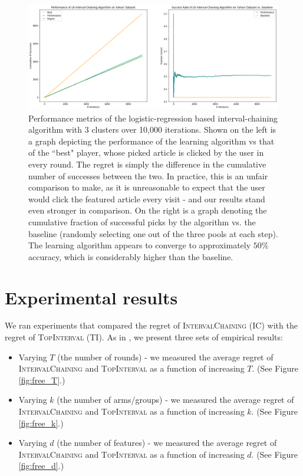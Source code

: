 \documentclass[11pt]{article}
\begin{document}
\begin{figure}
\includegraphics[width=\textwidth]{yahoo-interval-chaining.png}
\caption{Performance metrics of the logistic-regression based interval-chaining algorithm with $3$ clusters over 10,000 iterations. Shown on the left is a graph depicting the performance of the learning algorithm vs that of the ``best" player, whose picked article is clicked by the user in every round. The regret is simply the difference in the cumulative number of successes between the two. In practice, this is an unfair comparison to make, as it is unreasonable to expect that the user would click the featured article every visit - and our results stand even stronger in comparison. On the right is a graph denoting the cumulative fraction of successful picks by the algorithm vs. the baseline (randomly selecting one out of the three pools at each step). The learning algorithm appears to converge to approximately $50\%$ accuracy, which is considerably higher than the baseline. \label{fig:yahoo}}
\end{figure}

\section{Experimental results}

We ran experiments that compared the regret of \textsc{IntervalChaining} (IC) with the regret of \textsc{TopInterval} (TI). As in , we present three sets of empirical results: 
\begin{itemize}
	\item Varying $T$ (the number of rounds) - we measured the average regret of \textsc{IntervalChaining} and \textsc{TopInterval} as a function of increasing $T$. (See Figure \ref{fig:free_T}.)
	\item Varying $k$ (the number of arms/groups) - we measured the average regret of \textsc{IntervalChaining} and \textsc{TopInterval} as a function of increasing $k$. (See Figure \ref{fig:free_k}.)
	\item Varying $d$ (the number of features) - we measured the average regret of \textsc{IntervalChaining} and \textsc{TopInterval} as a function of increasing $d$. (See Figure \ref{fig:free_d}.)
\end{itemize} 
\end{document}
